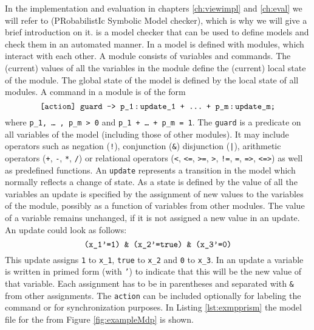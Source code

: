 \documentclass[preview]{standalone}
\begin{document}
In the implementation and evaluation in chapters \ref{ch:viewimpl} and \ref{ch:eval} we will refer to \prism (PRobabilistIc Symbolic Model checker), which is why we will give a brief introduction on it. \prism is a model checker that can be used to define models and check them in an automated manner. In \prism a model is defined with modules, which interact with each other. A module consists of variables and commands. The (current) values of all the variables in the module define the (current) local state of the module. The global state of the model is defined by the local state of all modules.
A command in a module is of the form 
\[
\text{\texttt{[action] guard -> p\_1\!\;:\!\;update\_1\space+\space\dots\;\,+\space p\_m\!\;:\!\;update\_m;}} 
\]
where \texttt{p\_1, \dots\;\,, p\_m > 0} and \texttt{p\_1 + \dots\;\,+ p\_m = 1}.
The \texttt{guard} is a predicate on all variables of the model (including those of other modules). It may include operators such as negation (\texttt{!}), conjunction (\texttt{\&}) disjunction (\texttt{|}), arithmetic operators (\texttt{+}, \texttt{-}, \texttt{*}, \texttt{/}) or relational operators (\texttt{<}, \texttt{<=}, \texttt{>=}, \texttt{>}, \texttt{!=}, \texttt{=}, \texttt{=>}, \texttt{<=>}) as well as predefined functions.
An \texttt{update} represents a transition in the model which normally reflects a change of state. As a state is defined by the value of all the variables an update is specified by the assignment of new values to the variables of the module, possibly as a function of variables from other modules. The value of a variable remains unchanged, if it is not assigned a new value in an update. An update could look as follows:
\[
\text{\texttt{(x\_1'=1) \& (x\_2'=true) \& (x\_3'=0)}}
\]
This update assigns \texttt{1} to \texttt{x\_1}, \texttt{true} to \texttt{x\_2} and \texttt{0} to \texttt{x\_3}. In an update a variable is written in primed form (with \texttt{'}) to indicate that this will be the new value of that variable. Each assignment has to be in parentheses and separated with \texttt{\&} from other assignments.
The \texttt{action} can be included optionally for labeling the command or for synchronization purposes. In Listing \ref{lst:exmpprism} the model file for the \mdpN \mdp from Figure \ref{fig:exampleMdp} is shown.
\end{document}
